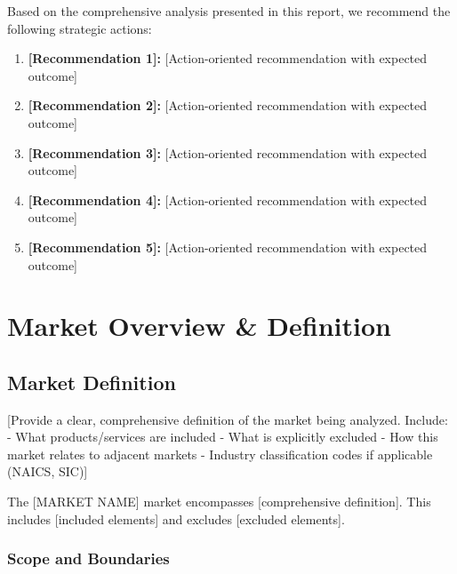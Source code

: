 \documentclass[11pt,letterpaper]{report}
\newcommand{\reporttitle}{[MARKET NAME]}
\begin{document}
Based on the comprehensive analysis presented in this report, we recommend the following strategic actions:

\begin{recommendationbox}
\begin{enumerate}
    \item \textbf{[Recommendation 1]:} [Action-oriented recommendation with expected outcome]
    \item \textbf{[Recommendation 2]:} [Action-oriented recommendation with expected outcome]
    \item \textbf{[Recommendation 3]:} [Action-oriented recommendation with expected outcome]
    \item \textbf{[Recommendation 4]:} [Action-oriented recommendation with expected outcome]
    \item \textbf{[Recommendation 5]:} [Action-oriented recommendation with expected outcome]
\end{enumerate}
\end{recommendationbox}

\chapter{Market Overview \& Definition}

\section{Market Definition}

[Provide a clear, comprehensive definition of the market being analyzed. Include:
- What products/services are included
- What is explicitly excluded
- How this market relates to adjacent markets
- Industry classification codes if applicable (NAICS, SIC)]

\begin{calloutbox}
The \reporttitle{} market encompasses [comprehensive definition]. This includes [included elements] and excludes [excluded elements].
\end{calloutbox}

\subsection{Scope and Boundaries}
\end{document}
